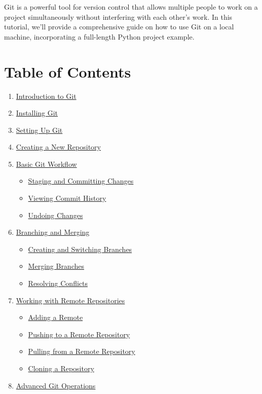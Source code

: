 \documentclass[
  letterpaper,
  DIV=11,
  numbers=noendperiod]{scrreprt}
\providecommand{\tightlist}{%
  \setlength{\itemsep}{0pt}\setlength{\parskip}{0pt}}\usepackage{longtable,booktabs,array}
\begin{document}
Git is a powerful tool for version control that allows multiple people
to work on a project simultaneously without interfering with each
other's work. In this tutorial, we'll provide a comprehensive guide on
how to use Git on a local machine, incorporating a full-length Python
project example.

\section{Table of Contents}\label{table-of-contents-26}

\begin{enumerate}
\def\labelenumi{\arabic{enumi}.}
\tightlist
\item
  \hyperref[introduction-to-git]{Introduction to Git}
\item
  \hyperref[installing-git]{Installing Git}
\item
  \hyperref[setting-up-git]{Setting Up Git}
\item
  \hyperref[creating-a-new-repository]{Creating a New Repository}
\item
  \hyperref[basic-git-workflow]{Basic Git Workflow}

  \begin{itemize}
  \tightlist
  \item
    \hyperref[staging-and-committing-changes]{Staging and Committing
    Changes}
  \item
    \hyperref[viewing-commit-history]{Viewing Commit History}
  \item
    \hyperref[undoing-changes]{Undoing Changes}
  \end{itemize}
\item
  \hyperref[branching-and-merging]{Branching and Merging}

  \begin{itemize}
  \tightlist
  \item
    \hyperref[creating-and-switching-branches]{Creating and Switching
    Branches}
  \item
    \hyperref[merging-branches]{Merging Branches}
  \item
    \hyperref[resolving-conflicts]{Resolving Conflicts}
  \end{itemize}
\item
  \hyperref[working-with-remote-repositories]{Working with Remote
  Repositories}

  \begin{itemize}
  \tightlist
  \item
    \hyperref[adding-a-remote]{Adding a Remote}
  \item
    \hyperref[pushing-to-a-remote-repository]{Pushing to a Remote
    Repository}
  \item
    \hyperref[pulling-from-a-remote-repository]{Pulling from a Remote
    Repository}
  \item
    \hyperref[cloning-a-repository]{Cloning a Repository}
  \end{itemize}
\item
  \hyperref[advanced-git-operations]{Advanced Git Operations}


\end{enumerate}
\end{document}
